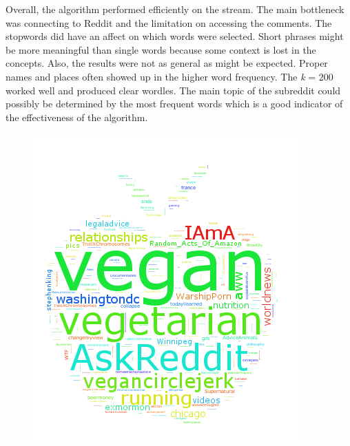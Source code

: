 \documentclass[12pt]{article}
\numberwithin{equation}{section}
\begin{document}
Overall, the algorithm performed efficiently on the stream.  The main bottleneck was connecting to Reddit and the limitation on accessing the comments.  The stopwords did have an affect on which words were selected.  Short phrases might be more meaningful than single words because some context is lost in the concepts.  Also, the results were not as general as might be expected.  Proper names and places often showed up in the higher word frequency.  The \textit{k} = 200 worked well and produced clear wordles.  The main topic of the subreddit could possibly be determined by the most frequent words which is a good indicator of the effectiveness of the algorithm.   

  


\begin{figure}[h!]
	\centering
	\includegraphics[scale=.6]{vegan_30.png}
\end{figure}




	
	
	
\end{document}
